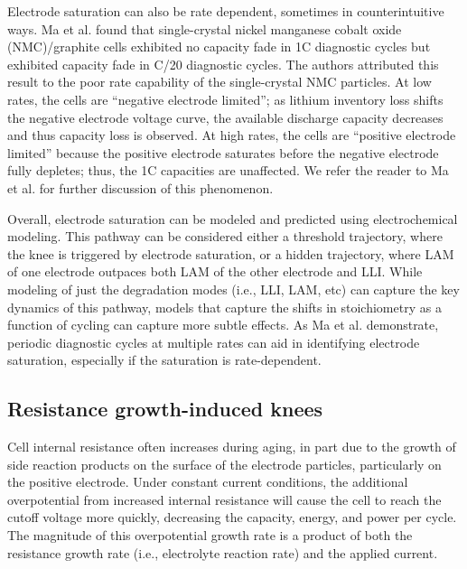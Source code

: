 \documentclass[journal=jpclcd,manuscript=article]{achemso}
\begin{document}
Electrode saturation can also be rate dependent, sometimes in counterintuitive ways. Ma et al.\cite{ma_editors_2019} found that single-crystal nickel manganese cobalt oxide (NMC)/graphite cells exhibited no capacity fade in 1C diagnostic cycles but exhibited capacity fade in C/20 diagnostic cycles. The authors attributed this result to the poor rate capability of the single-crystal NMC particles. At low rates, the cells are ``negative electrode limited''; as lithium inventory loss shifts the negative electrode voltage curve, the available discharge capacity decreases and thus capacity loss is observed. At high rates, the cells are ``positive electrode limited'' because the positive electrode saturates before the negative electrode fully depletes; thus, the 1C capacities are unaffected. We refer the reader to Ma et al.\cite{ma_editors_2019} for further discussion of this phenomenon.

Overall, electrode saturation can be modeled and predicted using electrochemical modeling. This pathway can be considered either a threshold trajectory, where the knee is triggered by electrode saturation, or a hidden trajectory, where LAM of one electrode outpaces both LAM of the other electrode and LLI. While modeling of just the degradation modes (i.e., LLI, LAM, etc) can capture the key dynamics of this pathway, models that capture the shifts in stoichiometry as a function of cycling can capture more subtle effects. As Ma et al.\cite{ma_editors_2019} demonstrate, periodic diagnostic cycles at multiple rates can aid in identifying electrode saturation, especially if the saturation is rate-dependent.

\subsection{Resistance growth-induced knees}

Cell internal resistance often increases during aging, in part due to the growth of side reaction products on the surface of the electrode particles, particularly on the positive electrode\cite{ma_editors_2019}. Under constant current conditions, the additional overpotential from increased internal resistance will cause the cell to reach the cutoff voltage more quickly, decreasing the capacity, energy, and power per cycle. The magnitude of this overpotential growth rate is a product of both the resistance growth rate (i.e., electrolyte reaction rate) and the applied current.
\end{document}
